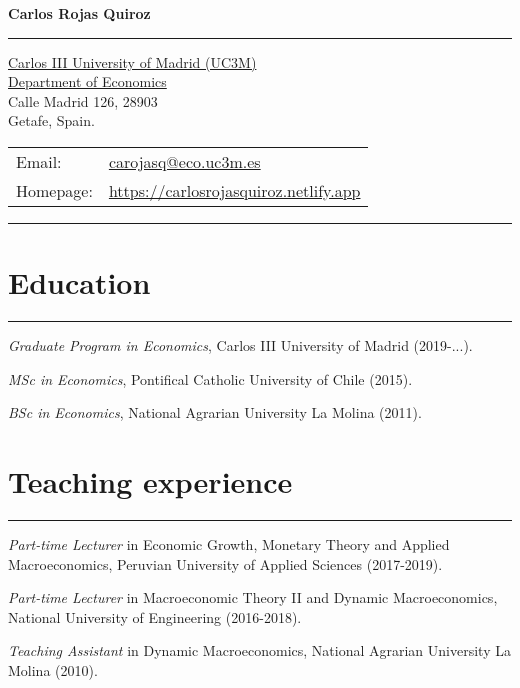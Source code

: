 \documentclass[letterpaper, Biolinum]{article}
\def\name{\textbf{Carlos Rojas Quiroz}}
\renewenvironment{itemize}{
  \begin{list}{}{
    \setlength{\leftmargin}{1.5em}
  }
}{
  \end{list}
}
\begin{document}
{\huge \name}


\hrule 
\vspace{0.10in}
\begin{minipage}{0.45\linewidth}
  \href{http://economics.uc3m.es}{Carlos III University of Madrid (UC3M)} \\
  \href{http://economics.uc3m.es}{Department of Economics} \\
  Calle Madrid 126, 28903 \\
  Getafe, Spain.
\end{minipage}
\begin{minipage}{0.45\linewidth}
  \begin{tabular}{ll}
    Email: & \href{mailto:carojasq@eco.uc3m.es}{carojasq@eco.uc3m.es} \\
    Homepage: & \href{https://carlosrojasquiroz.netlify.app}{https://carlosrojasquiroz.netlify.app} \\
  \end{tabular}
\end{minipage}
\vspace{0.1in}
\hrule

\section*{Education}
\vspace{-0.1in}
\hrule
\vspace{0.1in}
\begin{itemize} 
  \item \textit{Graduate Program in Economics}, Carlos III University of Madrid (2019-...).
  \item \textit{MSc in Economics}, Pontifical Catholic University of Chile (2015).
  \item \textit{BSc in Economics}, National Agrarian University La Molina (2011).
\end{itemize}


\section*{Teaching experience}
\vspace{-0.1in}
\hrule
\vspace{0.1in}
\begin{itemize} 
\item \textit{Part-time Lecturer} in Economic Growth, Monetary Theory and Applied Macroeconomics, Peruvian University of Applied Sciences (2017-2019).
\item \textit{Part-time Lecturer} in Macroeconomic Theory II and Dynamic Macroeconomics, National University of Engineering (2016-2018).
\item \textit{Teaching Assistant} in Dynamic Macroeconomics, National Agrarian University La Molina (2010).
\end{itemize}
\end{document}
